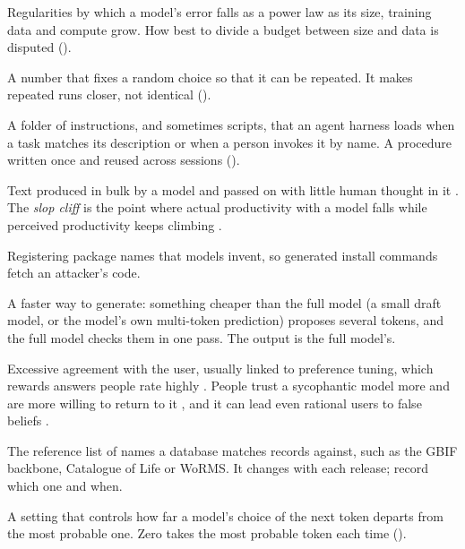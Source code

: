 \begin{description}[itemsep=0.2em]
\item[Scaling laws] Regularities by which a model's error falls as a power law
  as its size, training data and compute grow. How best to divide a budget
  between size and data is disputed
  \parencite{kaplan2020scaling,hoffmann2022chinchilla} ().

\item[Seed] A number that fixes a random choice so that it can be repeated.
  It makes repeated runs closer, not identical ().

\item[Skill] A folder of instructions, and sometimes scripts, that an agent
  harness loads when a task matches its description or when a person invokes
  it by name. A procedure written once and reused across sessions
  ().

\item[Slop] Text produced in bulk by a model and passed on with little human
  thought in it \parencite{turner2026slop}. The \emph{slop cliff} is the point
  where actual productivity with a model falls while perceived productivity
  keeps climbing \parencite{jiralerspong2026slopcliff}.

\item[Slopsquatting] Registering package names that models invent, so generated
  install commands fetch an attacker's code.

\item[Speculative decoding] A faster way to generate: something cheaper than
  the full model (a small draft model, or the model's own multi-token
  prediction) proposes several tokens, and the full model checks them in one
  pass. The output is the full model's.

\item[Sycophancy] Excessive agreement with the user, usually linked to
  preference tuning, which rewards answers people rate highly
  \parencite{sharma2024sycophancy}. People trust a sycophantic model more and
  are more willing to return to it \parencite{cheng2026sycophancy}, and it can
  lead even rational users to false beliefs \parencite{chandra2026spiraling}.

\item[Taxonomic backbone] The reference list of names a database matches
  records against, such as the GBIF backbone, Catalogue of Life or WoRMS. It
  changes with each release; record which one and when.

\item[Temperature] A setting that controls how far a model's choice of the
  next token departs from the most probable one. Zero takes the most probable
  token each time ().


\end{description}
